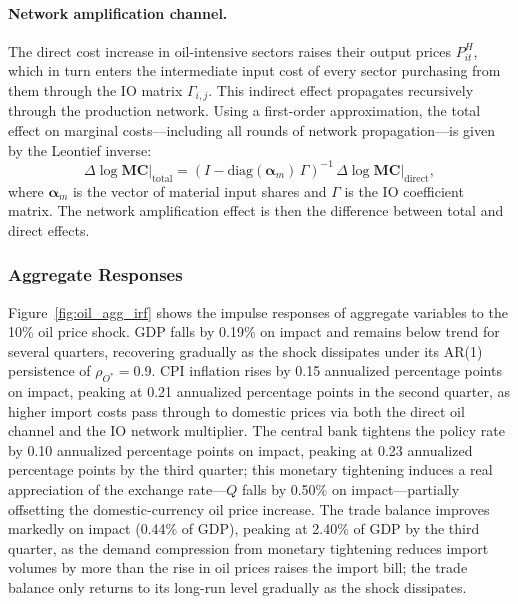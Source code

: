 \paragraph{Network amplification channel.}
The direct cost increase in oil-intensive sectors raises their output prices $P^H_{it}$, which in turn enters the intermediate input cost of every sector purchasing from them through the IO matrix $\Gamma_{i,j}$.
This indirect effect propagates recursively through the production network.
Using a first-order approximation, the total effect on marginal costs---including all rounds of network propagation---is given by the Leontief inverse:
\begin{equation}
    \Delta \log \mathbf{MC}\bigg|_{\text{total}} = \left(I - \text{diag}(\boldsymbol{\alpha}_m)\,\Gamma\right)^{-1}\,\Delta \log \mathbf{MC}\bigg|_{\text{direct}},
    \label{eq:leontief_mc}
\end{equation}
where $\boldsymbol{\alpha}_m$ is the vector of material input shares and $\Gamma$ is the IO coefficient matrix.
The network amplification effect is then the difference between total and direct effects.

\subsubsection{Aggregate Responses}

Figure~\ref{fig:oil_agg_irf} shows the impulse responses of aggregate variables to the 10\% oil price shock.
GDP falls by 0.19\% on impact and remains below trend for several quarters, recovering gradually as the shock dissipates under its AR(1) persistence of $\rho_{O^*}=0.9$.
CPI inflation rises by 0.15 annualized percentage points on impact, peaking at 0.21 annualized percentage points in the second quarter, as higher import costs pass through to domestic prices via both the direct oil channel and the IO network multiplier.
The central bank tightens the policy rate by 0.10 annualized percentage points on impact, peaking at 0.23 annualized percentage points by the third quarter; this monetary tightening induces a real appreciation of the exchange rate---$Q$ falls by 0.50\% on impact---partially offsetting the domestic-currency oil price increase.
The trade balance improves markedly on impact (0.44\% of GDP), peaking at 2.40\% of GDP by the third quarter, as the demand compression from monetary tightening reduces import volumes by more than the rise in oil prices raises the import bill; the trade balance only returns to its long-run level gradually as the shock dissipates.

